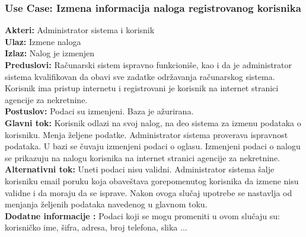 \documentclass{article}
\begin{document}
\subsubsection{\bfseries Use Case: Izmena informacija naloga registrovanog korisnika}
{\bfseries Akteri:} Administrator sistema i korisnik\\
{\bfseries Ulaz:} Izmene naloga\\
{\bfseries Izlaz:} Nalog je izmenjen\\
{\bfseries Preduslovi:} Ra\v {c}unarski sistem ispravno funkcioni\v {s}e, kao i da je administrator sistema kvalifikovan da obavi sve zadatke odr\v {z}avanja ra\v {c}unarskog sistema. Korisnik ima pristup internetu i registrovani je korisnik na internet stranici agencije za nekretnine.\\
{\bfseries Postuslov:} Podaci su izmenjeni. Baza je a\v {z}urirana.\\
{\bfseries Glavni tok:} Korisnik odlazi na svoj nalog, na deo sistema za izmenu podataka o korisniku. Menja \v {z}eljene podatke. Administrator sistema proverava ispravnost podataka. U bazi se \v {c}uvaju izmenjeni podaci o oglasu. Izmenjeni podaci o nalogu se prikazuju na nalogu korisnika na internet stranici agencije za nekretnine.\\
{\bfseries Alternativni tok:} Uneti podaci nisu validni. Administrator sistema \v {s}alje korisniku email poruku koja obave\v {s}tava gorepomenutog korisnika da izmene nisu validne i da moraju da se isprave. Nakon ovoga slu\v {c}aj upotrebe se nastavlja od menjanja \v {z}eljenih podataka navedenog u glavnom toku.\\
{\bfseries Dodatne informacije :} Podaci koji se mogu promeniti u ovom slu\v {c}aju su: korisni\v {c}ko ime, \v {s}ifra, adresa, broj telefona, slika ...\\
\end{document}
